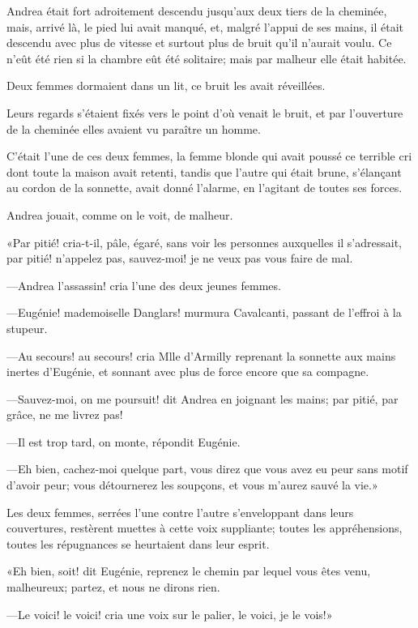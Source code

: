 Andrea était fort adroitement descendu jusqu'aux deux tiers de la cheminée, mais, arrivé là, le pied lui avait manqué, et, malgré l'appui de ses mains, il était descendu avec plus de vitesse et surtout plus de bruit qu'il n'aurait voulu. Ce n'eût été rien si la chambre eût été solitaire; mais par malheur elle était habitée. 

Deux femmes dormaient dans un lit, ce bruit les avait réveillées. 

Leurs regards s'étaient fixés vers le point d'où venait le bruit, et par l'ouverture de la cheminée elles avaient vu paraître un homme. 

C'était l'une de ces deux femmes, la femme blonde qui avait poussé ce terrible cri dont toute la maison avait retenti, tandis que l'autre qui était brune, s'élançant au cordon de la sonnette, avait donné l'alarme, en l'agitant de toutes ses forces. 

Andrea jouait, comme on le voit, de malheur. 

«Par pitié! cria-t-il, pâle, égaré, sans voir les personnes auxquelles il s'adressait, par pitié! n'appelez pas, sauvez-moi! je ne veux pas vous faire de mal. 

—Andrea l'assassin! cria l'une des deux jeunes femmes. 

—Eugénie! mademoiselle Danglars! murmura Cavalcanti, passant de l'effroi à la stupeur. 

—Au secours! au secours! cria Mlle d'Armilly reprenant la sonnette aux mains inertes d'Eugénie, et sonnant avec plus de force encore que sa compagne. 

—Sauvez-moi, on me poursuit! dit Andrea en joignant les mains; par pitié, par grâce, ne me livrez pas! 

—Il est trop tard, on monte, répondit Eugénie. 

—Eh bien, cachez-moi quelque part, vous direz que vous avez eu peur sans motif d'avoir peur; vous détournerez les soupçons, et vous m'aurez sauvé la vie.» 

Les deux femmes, serrées l'une contre l'autre s'enveloppant dans leurs couvertures, restèrent muettes à cette voix suppliante; toutes les appréhensions, toutes les répugnances se heurtaient dans leur esprit. 

«Eh bien, soit! dit Eugénie, reprenez le chemin par lequel vous êtes venu, malheureux; partez, et nous ne dirons rien. 

—Le voici! le voici! cria une voix sur le palier, le voici, je le vois!» 

